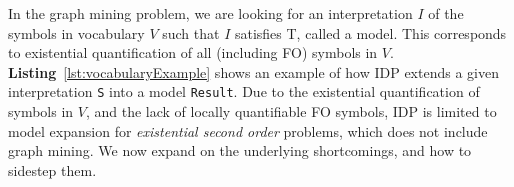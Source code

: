 In the graph mining problem, we are looking for an interpretation $I$ of the symbols in vocabulary $V$ such that $I$ satisfies T, called a model.
This corresponds to existential quantification of all (including FO) symbols in $V$.
\textbf{Listing}~\ref{lst:vocabularyExample} shows an example of how IDP extends a given interpretation \lstinline{S} into a model \lstinline{Result}.
Due to the existential quantification of symbols in $V$, and the lack of locally quantifiable FO symbols, IDP is limited to model expansion for \emph{existential second order} problems, which does not include graph mining.
We now expand on the underlying shortcomings, and how to sidestep them.
%
%
%


